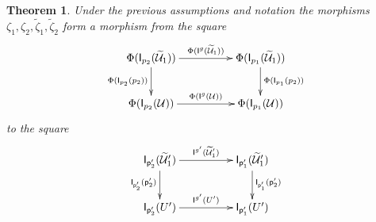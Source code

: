 \documentclass[12pt]{article}
\numberwithin{equation}{section}
\newtheorem{theorem}[proposition]{Theorem}
\newcommand{\wt}{\widetilde}
\newcommand{\p}{\mathsf{p}}
\newcommand{\U}{\mathcal{U}}
\newcommand{\I}{\mathsf{I}}
\begin{document}
%
\begin{theorem}
\label{2015.04.10.th3} Under the previous assumptions and notation the
morphisms $\zeta_1,\zeta_2,\wt{\zeta}_1,\wt{\zeta}_2$ form a morphism from the
square
%
$$
\begin{xy}
          \xymatrix@C=4pc{ \Phi(\I_{p_2}(\wt{\U}_1))
            \ar[r]^-{\Phi(\I^g(\wt{\U}_1))} \ar[d]_{\Phi(\I_{p_2}(p_2))} &
            \Phi(\I_{p_1}(\wt{\U}_1))
            \ar[d]^{\Phi(\I_{p_1}(p_2))}\\ \Phi(\I_{p_2}(\U))
            \ar[r]^{\Phi(\I^g(\U))} & \Phi(\I_{p_1}(\U)) }
\end{xy}
$$
%
to the square
%
$$
\begin{xy}
          \xymatrix@C=4pc{
                 \I_{\p_2'}(\wt{\U}_1')   \ar[r]^-{\I^{g'}(\wt{\U}_1')} \ar[d]_{\I_{\p_2'}(\p_2')} & 
                 \I_{\p_1'}(\wt{\U}_1') \ar[d]^{\I_{\p_1'}(\p_2')}\\
		\I_{\p_2'}(U')   \ar[r]^{\I^{g'}(U')} &
		\I_{\p_1'}(U')
                }
\end{xy}
$$
%
\end{theorem}
%
\end{document}
